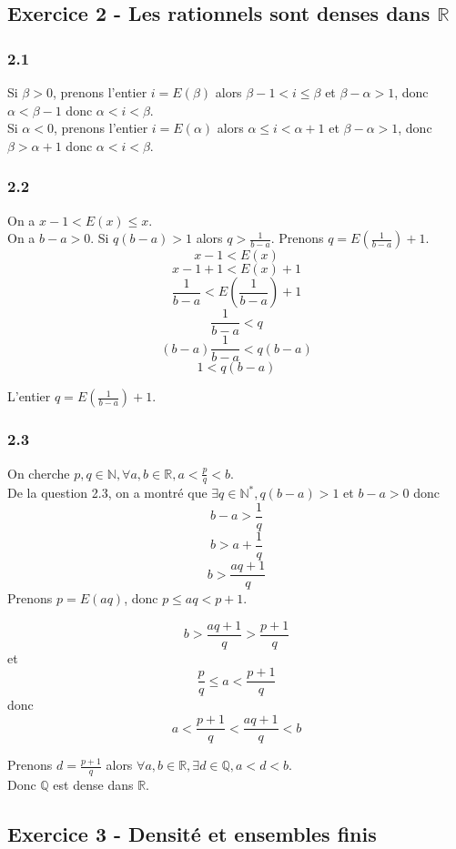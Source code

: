 \documentclass[]{book}
\theoremstyle{definition}
\newcommand{\bb}[1]{\mathbb{#1}}
\newcommand{\Q}{\bb{Q}}
\newcommand{\R}{\bb{R}}
\newcommand{\N}{\bb{N}}
\begin{document}
\subsection*{Exercice 2 -  Les rationnels sont denses dans $\R$}
\subsubsection*{2.1}

Si $\beta > 0$, prenons l'entier $i=E(\beta)$ alors $\beta-1< i \leq \beta$ et $\beta - \alpha > 1$, donc  $\alpha < \beta-1$ donc $\alpha<i<\beta$.\\

Si $\alpha < 0$, prenons l'entier $i=E(\alpha)$ alors $\alpha \leq i<\alpha+1$ et $\beta - \alpha > 1$, donc  $\beta > \alpha+1$ donc $\alpha<i<\beta$.\\

\subsubsection*{2.2}
On a $x-1 < E(x) \leq x$.\\ 
On a $b-a > 0$. Si $q(b-a) > 1$ alors $q>\frac{1}{b-a}$. Prenons $q=E(\frac{1}{b-a}) + 1$. 
$$x - 1 < E(x) $$
$$x-1+1 < E(x)+1 $$
$$\frac{1}{b-a} < E(\frac{1}{b-a}) + 1$$
$$\frac{1}{b-a} < q $$
$$(b-a)\frac{1}{b-a} < q(b-a) $$
$$1 < q(b-a)$$

L'entier $q=E(\frac{1}{b-a}) + 1$.

\subsubsection*{2.3}
On cherche $p, q \in \N, \forall a, b \in \R, a < \frac{p}{q} < b$.\\ 
De la question 2.3, on a montr\'e que $\exists q \in \N^{*}, q(b-a)>1$ et $b-a>0$ donc 
$$b-a>\frac{1}{q}$$
$$b> a+\frac{1}{q}$$
$$b>\frac{aq + 1}{q}$$
Prenons $p=E(aq)$, donc $p \leq aq < p+1$.

$$b>\frac{aq + 1}{q} > \frac{p + 1}{q}$$
et
$$\frac{p}{q} \leq a < \frac{p+1}{q}$$
donc
$$a < \frac{p+1}{q} < \frac{aq + 1}{q} < b$$

Prenons $d=\frac{p+1}{q}$ alors $\forall a,b \in \R, \exists d \in \Q, a < d < b$. \\
Donc $\Q$ est dense dans $\R$.

\subsection*{Exercice 3 - Densit\'e et ensembles finis}
\end{document}
